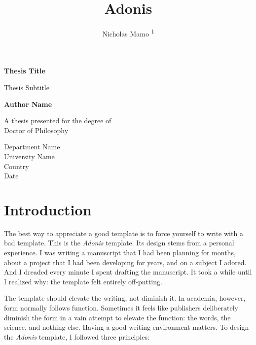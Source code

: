 \documentclass[12pt]{article}
\title{Adonis}
\author{Nicholas Mamo \textsuperscript{1}}
\begin{document}
	
	\begin{titlepage}
		\begin{center}
			\vspace*{1cm}
	
			\textbf{Thesis Title}
	
			\vspace{0.5cm}
			Thesis Subtitle
				
			\vspace{1.5cm}
	
			\textbf{Author Name}
	
			\vfill
				
			A thesis presented for the degree of\\
			Doctor of Philosophy
				
			\vspace{0.8cm}
		
				
			Department Name\\
			University Name\\
			Country\\
			Date
				
		\end{center}
	\end{titlepage}

	\tableofcontents

	\section{Introduction}
		The best way to appreciate a good template is to force yourself to write with a bad template. 
    This is the \textit{Adonis} template.
		Its design stems from a personal experience.
		I was writing a manuscript that I had been planning for months, about a project that I had been developing for years, and on a subject I adored.
		And I dreaded every minute I spent drafting the manuscript.
		It took a while until I realized why: the template felt entirely off-putting.
		
		The template should elevate the writing, not diminish it.
		In academia, however, form normally follows function.
		Sometimes it feels like publishers deliberately diminish the form in a vain attempt to elevate the function: the words, the science, and nothing else.
		Having a good writing environment matters.
		To design the \textit{Adonis} template, I followed three principles:
		
\end{document}
